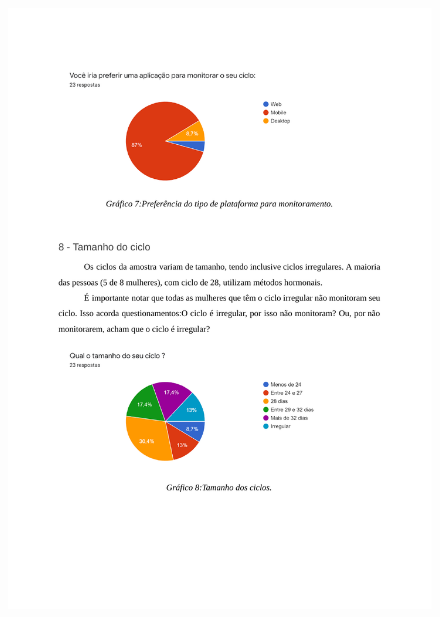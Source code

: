 \begin{apendicesenv}
        \begin{figure}[ht]
            \centering
            \includegraphics[keepaspectratio=true,scale=0.7]{figuras/Tab6.pdf}
        \end{figure}
        

\end{apendicesenv}

